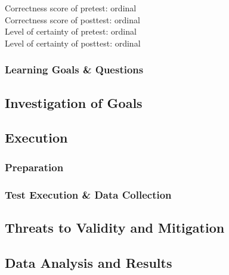 Correctness score of pretest: ordinal\\
Correctness score of posttest: ordinal\\
Level of certainty of pretest:  ordinal\\
Level of certainty of posttest: ordinal

\subsubsection{Learning Goals \& Questions}\label{subsubsec:questions}
 
\subsection{Investigation of Goals}\label{subsec:investigationgoals} 

\subsection{Execution}\label{subsec:execution} 
\subsubsection{Preparation }\label{subsubsec:prep}
\subsubsection{Test Execution \& Data Collection}\label{subsubsec:execution&data}


\subsection{Threats to Validity and Mitigation}\label{subsec:threats&mitigation}

\subsection{Data Analysis and Results }\label{subsec:results}